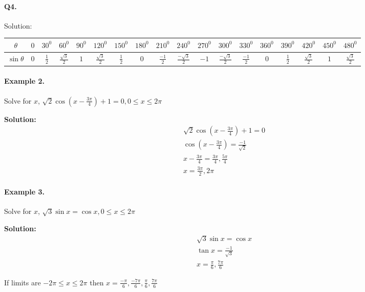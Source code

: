 \documentclass{article}
\begin{document}
\paragraph{Q4.}
Solution:

\begin{tabular}{|c|c|c|c|c|c|c|c|c|c|c|c|c|c|c|c|c|c|}
  \hline
$\theta$ & $0$ & $30^0$ & $60^0$ & $90^0$ & $120^0$ & $150^0$ & $180^0$ & $210^0$ & $240^0$ & $270^0$ & $300^0$ & $330^0$ & $360^0$ & $390^0$ & $420^0$ & $450^0$ & $480^0$ \\
  \hline
$\sin\theta$ & $0$ & $\frac{1}{2}$ & $\frac{\sqrt{3}}{2}$ & $1$ & $\frac{\sqrt{3}}{2}$ & $\frac{1}{2}$ & $0$ & $\frac{-1}{2}$ & $\frac{-\sqrt{3}}{2}$ & $-1$ & $\frac{-\sqrt{3}}{2}$ & $\frac{-1}{2}$ & $0$ & $\frac{1}{2}$ & $\frac{\sqrt{3}}{2}$ & $1$ & $\frac{\sqrt{3}}{2}$ \\
  \hline
\end{tabular}

\paragraph{Example 2.}
Solve for $x$, $\sqrt{2}\cos\left( x - \frac{3\pi}{4} \right) + 1 = 0, 0 \leq x \leq 2\pi$

{\scriptsize \textbf{Solution:}}
\[
  \begin{aligned}
    \sqrt{2}\cos\left( x - \frac{3\pi}{4} \right) + 1 = 0 \\
    \cos \left( x - \frac{3\pi}{4} \right) = \frac{-1}{\sqrt{2}} \\
    x - \frac{3\pi}{4} = \frac{3\pi}{4}, \frac{5\pi}{4} \\
    x = \frac{3\pi}{2}, 2\pi
  \end{aligned}
\]

\paragraph{Example 3.}
Solve for $x$, $\sqrt{3}\sin x = \cos x, 0 \leq x \leq 2\pi$

{\scriptsize \textbf{Solution:}}
\[
  \begin{aligned}
    \sqrt{3}\sin x = \cos x \\
    \tan x = \frac{-1}{\sqrt{3}} \\
    x = \frac{\pi}{6}, \frac{7\pi}{6}
  \end{aligned}
\]

If limits are $-2\pi \leq x \leq 2\pi$ then $x = \frac{-\pi}{6}, \frac{-7\pi}{6}, \frac{\pi}{6}, \frac{7\pi}{6}$
\end{document}
